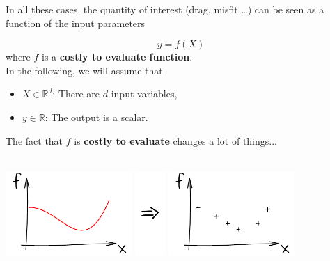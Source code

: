 \begin{frame}{}
In all these cases, the quantity of interest (drag, misfit \dots) can be seen as a function of the input parameters

$$ y = f(X) $$
where $f$ is a \textbf{costly to evaluate function}. \\
\vspace{5mm}
In the following, we will assume that
\begin{itemize}
	\item $X \in \mathds{R}^d$: There are $d$ input variables,
	\item $y \in \mathds{R}$: The output is a scalar.
\end{itemize}
\end{frame}

\begin{frame}{}
The fact that $f$ is \textbf{costly to evaluate} changes a lot of things...\\
\vspace{5mm}
\\
\vspace{5mm}
\begin{center}
\includegraphics[height=3.2cm]{1_stat_models/figures/ink_f} \includegraphics[height=3.2cm]{1_stat_models/figures/Rightarrow} \includegraphics[height=3.2cm]{1_stat_models/figures/ink_fX}
\end{center}
\end{frame}

